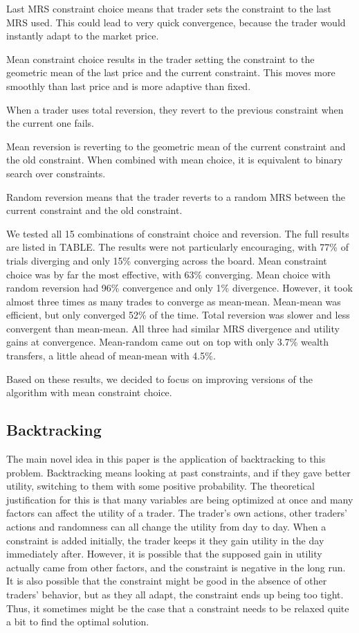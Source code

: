 \documentclass[12pt,a4paper,titlepage]{article}
\begin{document}
Last MRS constraint choice means that trader sets the constraint to the last MRS used.
This could lead to very quick convergence, because the trader would instantly adapt to the market price.

Mean constraint choice results in the trader setting the constraint to the geometric mean of the last price and the current constraint.
This moves more smoothly than last price and is more adaptive than fixed.

When a trader uses total reversion, they revert to the previous constraint when the current one fails.

Mean reversion is reverting to the geometric mean of the current constraint and the old constraint.
When combined with mean choice, it is equivalent to binary search over constraints.

Random reversion means that the trader reverts to a random MRS between the current constraint and the old constraint.

We tested all 15 combinations of constraint choice and reversion.
The full results are listed in TABLE.
The results were not particularly encouraging, with 77\% of trials diverging and only 15\% converging across the board.
Mean constraint choice was by far the most effective, with 63\% converging.
Mean choice with random reversion had 96\% convergence and only 1\% divergence.
However, it took almost three times as many trades to converge as mean-mean.
Mean-mean was efficient, but only converged 52\% of the time.
Total reversion was slower and less convergent than mean-mean.
All three had similar MRS divergence and utility gains at convergence.
Mean-random came out on top with only 3.7\% wealth transfers, a little ahead of mean-mean with 4.5\%.

Based on these results, we decided to focus on improving versions of the algorithm with mean constraint choice.

\subsection{Backtracking}

The main novel idea in this paper is the application of backtracking to this problem.
Backtracking means looking at past constraints, and if they gave better utility, switching to them with some positive probability.
The theoretical justification for this is that many variables are being optimized at once and many factors can affect the utility of a trader.
The trader's own actions, other traders' actions and randomness can all change the utility from day to day.
When a constraint is added initially, the trader keeps it they gain utility in the day immediately after.
However, it is possible that the supposed gain in utility actually came from other factors, and the constraint is negative in the long run.
It is also possible that the constraint might be good in the absence of other traders' behavior, but as they all adapt, the constraint ends up being too tight.
Thus, it sometimes might be the case that a constraint needs to be relaxed quite a bit to find the optimal solution.
\end{document}
